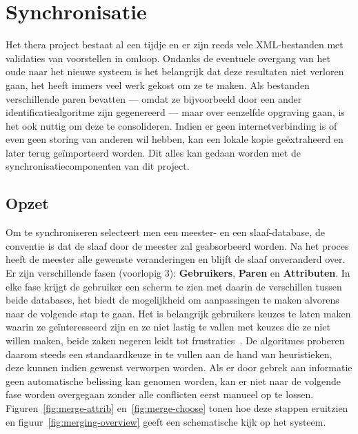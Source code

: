 \chapter{Synchronisatie}
\label{hoofdstuk:synchronisatie}
Het thera project bestaat al een tijdje en er zijn reeds vele XML-bestanden met validaties van voorstellen in omloop. Ondanks de eventuele overgang van het oude naar het nieuwe systeem is het belangrijk dat deze resultaten niet verloren gaan, het heeft immers veel werk gekost om ze te maken. Als bestanden verschillende paren bevatten --- omdat ze bijvoorbeeld door een ander identificatiealgoritme zijn gegenereerd --- maar over eenzelfde opgraving gaan, is het ook nuttig om deze te consolideren. Indien er geen internetverbinding is of even geen storing van anderen wil hebben, kan een lokale kopie ge\"extraheerd en later terug ge\"importeerd worden. Dit alles kan gedaan worden met de synchronisatiecomponenten van dit project.

\section{Opzet}
Om te synchroniseren selecteert men een meester- en een slaaf-database, de conventie is dat de slaaf door de meester zal geabsorbeerd worden. Na het proces heeft de meester alle gewenste veranderingen en blijft de slaaf onveranderd over. Er zijn verschillende fasen (voorlopig 3): \textbf{Gebruikers}, \textbf{Paren} en \textbf{Attributen}. In elke fase krijgt de gebruiker een scherm te zien met daarin de verschillen tussen beide databases, het biedt de mogelijkheid om aanpassingen te maken alvorens naar de volgende stap te gaan. Het is belangrijk gebruikers keuzes te laten maken waarin ze ge\"interesseerd zijn en ze niet lastig te vallen met keuzes die ze niet willen maken, beide zaken negeren leidt tot frustraties~\cite{Joel2001}. De algoritmes proberen daarom steeds een standaardkeuze in te vullen aan de hand van heuristieken, deze kunnen indien gewenst verworpen worden. Als er door gebrek aan informatie geen automatische belissing kan genomen worden, kan er niet naar de volgende fase worden overgegaan zonder alle conflicten eerst manueel op te lossen. Figuren~\ref{fig:merge-attrib} en~\ref{fig:merge-choose} tonen hoe deze stappen eruitzien en figuur~\ref{fig:merging-overview} geeft een schematische kijk op het systeem.\\

